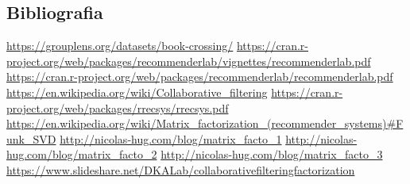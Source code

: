 \documentclass[12pt]{article}
\begin{document}
\begin{flushleft}
\newpage
\section{Bibliografia}
\begin{thebibliography}{}
 \url{https://grouplens.org/datasets/book-crossing/}
 \url{https://cran.r-project.org/web/packages/recommenderlab/vignettes/recommenderlab.pdf}
 \url{https://cran.r-project.org/web/packages/recommenderlab/recommenderlab.pdf}
 \url{https://en.wikipedia.org/wiki/Collaborative_filtering}
 \url{https://cran.r-project.org/web/packages/rrecsys/rrecsys.pdf}
 \url{https://en.wikipedia.org/wiki/Matrix\_factorization\_(recommender\_systems)#Funk\_SVD}
 \url{http://nicolas-hug.com/blog/matrix\_facto\_1}
 \url{http://nicolas-hug.com/blog/matrix\_facto\_2}
 \url{http://nicolas-hug.com/blog/matrix\_facto\_3}
 \url{https://www.slideshare.net/DKALab/collaborativefilteringfactorization}
\end{thebibliography}
\end{flushleft}
\end{document}
